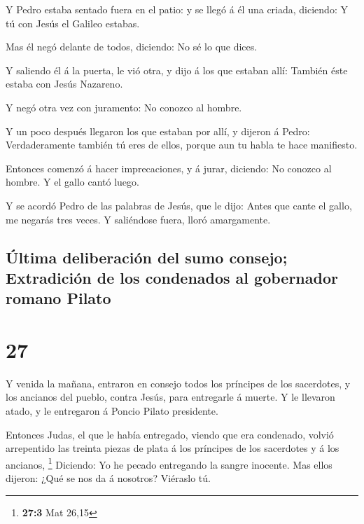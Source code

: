  Y Pedro estaba sentado fuera en el patio: y se llegó á
él una criada, diciendo: Y tú con Jesús el Galileo estabas.

 Mas él negó delante de todos, diciendo: No sé lo que
dices.

 Y saliendo él á la puerta, le vió otra, y dijo á los que
estaban allí: También éste estaba con Jesús Nazareno.

 Y negó otra vez con juramento: No conozco al hombre.

 Y un poco después llegaron los que estaban por allí, y
dijeron á Pedro: Verdaderamente también tú eres de ellos, porque aun tu
habla te hace manifiesto.

 Entonces comenzó á hacer imprecaciones, y á jurar,
diciendo: No conozco al hombre. Y el gallo cantó luego.

 Y se acordó Pedro de las palabras de Jesús, que le dijo:
Antes que cante el gallo, me negarás tres veces. Y saliéndose fuera,
lloró amargamente.

\hypertarget{uxfaltima-deliberaciuxf3n-del-sumo-consejo-extradiciuxf3n-de-los-condenados-al-gobernador-romano-pilato}{%
\subsection{Última deliberación del sumo consejo; Extradición de los
condenados al gobernador romano
Pilato}\label{uxfaltima-deliberaciuxf3n-del-sumo-consejo-extradiciuxf3n-de-los-condenados-al-gobernador-romano-pilato}}

\hypertarget{section-26}{%
\section{27}\label{section-26}}

 Y venida la mañana, entraron en consejo todos los
príncipes de los sacerdotes, y los ancianos del pueblo, contra Jesús,
para entregarle á muerte.  Y le llevaron atado, y le
entregaron á Poncio Pilato presidente.

 Entonces Judas, el que le había entregado, viendo que era
condenado, volvió arrepentido las treinta piezas de plata á los
príncipes de los sacerdotes y á los ancianos, \footnote{\textbf{27:3}
  Mat 26,15}  Diciendo: Yo he pecado entregando la sangre
inocente. Mas ellos dijeron: ¿Qué se nos da á nosotros? Viéraslo tú.

